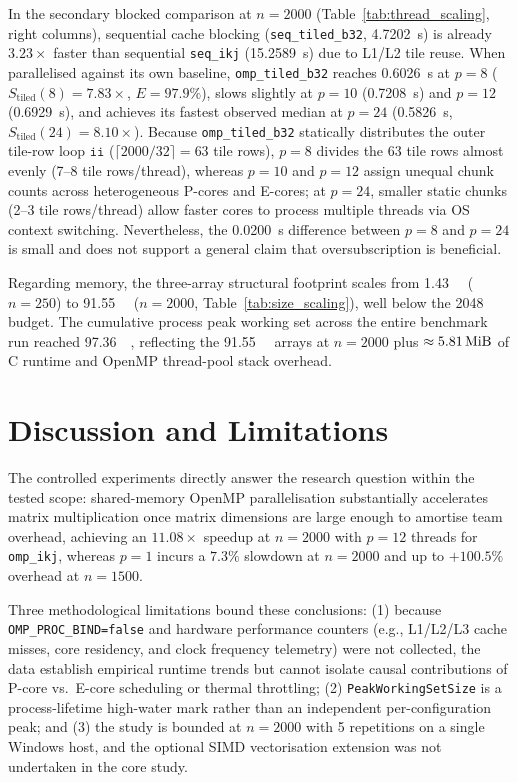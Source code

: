 \documentclass[11pt,a4paper]{article}
\begin{document}
In the secondary blocked comparison at $n=2000$ (Table~\ref{tab:thread_scaling}, right columns), sequential cache blocking (\texttt{seq\_tiled\_b32}, \SI{4.7202}{\second}) is already $3.23\times$ faster than sequential \texttt{seq\_ikj} (\SI{15.2589}{\second}) due to L1/L2 tile reuse. When parallelised against its own baseline, \texttt{omp\_tiled\_b32} reaches \SI{0.6026}{\second} at $p=8$ ($S_{\text{tiled}}(8) = 7.83\times$, $E=97.9\%$), slows slightly at $p=10$ (\SI{0.7208}{\second}) and $p=12$ (\SI{0.6929}{\second}), and achieves its fastest observed median at $p=24$ (\SI{0.5826}{\second}, $S_{\text{tiled}}(24) = 8.10\times$). Because \texttt{omp\_tiled\_b32} statically distributes the outer tile-row loop $\texttt{ii}$ ($\lceil 2000 / 32 \rceil = 63$ tile rows), $p=8$ divides the 63 tile rows almost evenly (7--8 tile rows/thread), whereas $p=10$ and $p=12$ assign unequal chunk counts across heterogeneous P-cores and E-cores; at $p=24$, smaller static chunks (2--3 tile rows/thread) allow faster cores to process multiple threads via OS context switching. Nevertheless, the \SI{0.0200}{\second} difference between $p=8$ and $p=24$ is small and does not support a general claim that oversubscription is beneficial.

Regarding memory, the three-array structural footprint scales from \SI{1.43}{\mebi\byte} ($n=250$) to \SI{91.55}{\mebi\byte} ($n=2000$, Table~\ref{tab:size_scaling}), well below the \SI{2048}{\mebi\byte} budget. The cumulative process peak working set across the entire benchmark run reached \SI{97.36}{\mebi\byte}, reflecting the \SI{91.55}{\mebi\byte} arrays at $n=2000$ plus $\approx \SI{5.81}{\mebi\byte}$ of C runtime and OpenMP thread-pool stack overhead.
\section{Discussion and Limitations}
The controlled experiments directly answer the research question within the tested scope: shared-memory OpenMP parallelisation substantially accelerates matrix multiplication once matrix dimensions are large enough to amortise team overhead, achieving an $11.08\times$ speedup at $n=2000$ with $p=12$ threads for \texttt{omp\_ikj}, whereas $p=1$ incurs a $7.3\%$ slowdown at $n=2000$ and up to $+100.5\%$ overhead at $n=1500$.

Three methodological limitations bound these conclusions: (1) because \texttt{OMP\_PROC\_BIND=false} and hardware performance counters (e.g., L1/L2/L3 cache misses, core residency, and clock frequency telemetry) were not collected, the data establish empirical runtime trends but cannot isolate causal contributions of P-core vs.\ E-core scheduling or thermal throttling; (2) \texttt{PeakWorkingSetSize} is a process-lifetime high-water mark rather than an independent per-configuration peak; and (3) the study is bounded at $n=2000$ with 5 repetitions on a single Windows host, and the optional SIMD vectorisation extension was not undertaken in the core study.
\end{document}
